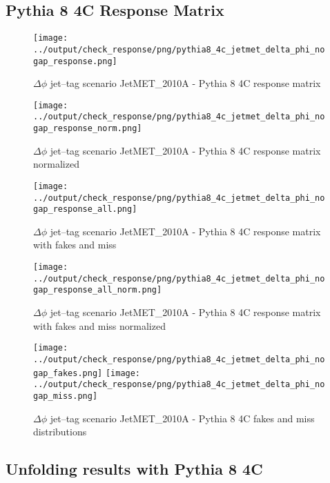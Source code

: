 \documentclass[11pt]{book}
\begin{document}
\clearpage
\subsection{Pythia 8 4C Response Matrix}


\begin{figure}[ht]
\centering
\texttt{[image: ../output/check\_response/png/pythia8\_4c\_jetmet\_delta\_phi\_nogap\_response.png]}
\caption{$\Delta\phi$ jet--tag scenario JetMET\_2010A - Pythia 8 4C response matrix}
\label{p8_jetmet_delta_phi_nogap_response}
\end{figure}

\begin{figure}[ht]
\centering
\texttt{[image: ../output/check\_response/png/pythia8\_4c\_jetmet\_delta\_phi\_nogap\_response\_norm.png]}
\caption{$\Delta\phi$ jet--tag scenario JetMET\_2010A - Pythia 8 4C response matrix normalized}
\label{p8_jetmet_delta_phi_nogap_response_norm}
\end{figure}

\begin{figure}[ht]
\centering
\texttt{[image: ../output/check\_response/png/pythia8\_4c\_jetmet\_delta\_phi\_nogap\_response\_all.png]}
\caption{$\Delta\phi$ jet--tag scenario JetMET\_2010A - Pythia 8 4C response matrix with fakes and miss}
\label{p8_jetmet_delta_phi_nogap_response_all}
\end{figure}

\begin{figure}[ht]
\centering
\texttt{[image: ../output/check\_response/png/pythia8\_4c\_jetmet\_delta\_phi\_nogap\_response\_all\_norm.png]}
\caption{$\Delta\phi$ jet--tag scenario JetMET\_2010A - Pythia 8 4C response matrix with fakes and miss normalized}
\label{p8_jetmet_delta_phi_nogap_response_all_norm}
\end{figure}

\begin{figure}[ht]
\centering
\texttt{[image: ../output/check\_response/png/pythia8\_4c\_jetmet\_delta\_phi\_nogap\_fakes.png]}
\texttt{[image: ../output/check\_response/png/pythia8\_4c\_jetmet\_delta\_phi\_nogap\_miss.png]}
\caption{$\Delta\phi$ jet--tag scenario JetMET\_2010A - Pythia 8 4C fakes and miss distributions}
\label{p8_jetmet_delta_phi_nogap_fakesmiss}
\end{figure}


\clearpage
\subsection{Unfolding results with Pythia 8 4C}
\end{document}
